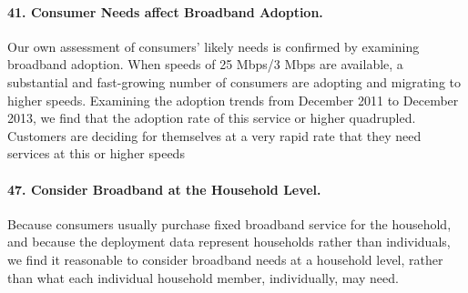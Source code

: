 \paragraph{41. Consumer Needs affect Broadband Adoption. } Our own assessment of
consumers’ likely needs is confirmed by examining broadband
adoption. When speeds of 25 Mbps/3 Mbps are available, a substantial 
and fast-growing number of consumers are adopting and migrating to 
higher speeds. Examining the adoption trends from December 2011 to 
December 2013, we find that the adoption rate of this service or 
higher quadrupled. Customers are deciding for themselves at a very 
rapid rate that they need services at this or higher speeds

\paragraph{47. Consider Broadband at the Household Level. }
Because consumers usually purchase fixed broadband service for the household, and because the 
deployment data represent households rather than individuals, we find it reasonable to consider 
broadband needs at a household level, rather than what each individual household member, individually, 
may need.


